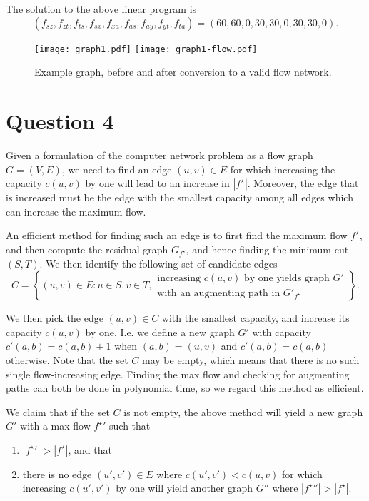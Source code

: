 \documentclass[a4paper, 10pt, oneside, article]{memoir}
\begin{document}
The solution to the above linear program is
$$(f_{sz}, f_{zt}, f_{ts}, f_{sx}, f_{xa}, f_{as}, f_{ay}, f_{yt}, f_{ta}) = (60, 60, 0, 30, 30, 0, 30, 30, 0).$$

\begin{figure}[h]
  \centering
  \texttt{[image: graph1.pdf]}
  \texttt{[image: graph1-flow.pdf]}
  \caption{Example graph, before and after conversion to a valid flow
    network.}
  \label{fig:example-graph}
\end{figure}

\section*{Question 4}

Given a formulation of the computer network problem as a flow graph
$G=(V,E)$, we need to find an edge $(u,v) \in E$ for which increasing
the capacity $c(u,v)$ by one will lead to an increase in
$|f^\star|$. Moreover, the edge that is increased must be the edge
with the smallest capacity among all edges which can increase the
maximum flow.

An efficient method for finding such an edge is to first find the
maximum flow $f^\star$, and then compute the residual graph
$G_{f^\star}$, and hence finding the minimum cut $(S,T)$. We then
identify the following set of candidate edges
$$
 C = \left\{ (u,v) \in E : u \in S, v \in T,
\substack{\text{increasing $c(u,v)$ by one yields graph $G'$} \\ \text{with an augmenting path in $G'_{f^\star}$}} \right\}.
$$

We then pick the edge $(u,v) \in C$ with the smallest capacity, and
increase its capacity $c(u,v)$ by one. I.e. we define a new graph $G'$
with capacity $c'(a,b) = c(a,b)+1$ when $(a,b) = (u,v)$ and $c'(a,b) =
c(a,b)$ otherwise. Note that the set $C$ may be empty, which means
that there is no such single flow-increasing edge. Finding the max
flow and checking for augmenting paths can both be done in polynomial
time, so we regard this method as efficient.

We claim that if the set $C$ is not empty, the above method will yield
a new graph $G'$ with a max flow ${f^\star}'$ such that
\begin{enumerate}
\item $|{f^\star}'| > |f^\star|$, and that
\item there is no edge $(u',v') \in E$ where $c(u',v') < c(u,v)$ for
  which increasing $c(u',v')$ by one will yield another graph $G''$
  where $|{f^\star}''| > |f^\star|$.
\end{enumerate}
\end{document}

